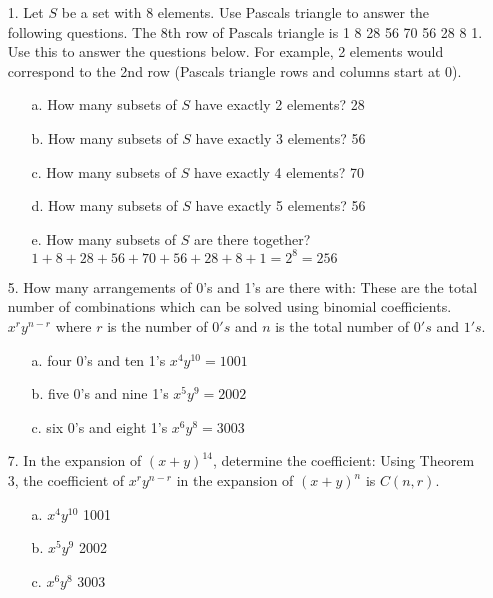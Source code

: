 \documentclass{article}
\begin{document}
\begin{itemize}
    \item[1.] Let $S$ be a set with 8 elements.  Use Pascals triangle to answer the following questions.
    The 8th row of Pascals triangle is {\color{olive}1 8 28 56 70 56 28 8 1}. Use this to answer the questions below.  For example, 2 elements would correspond to the 2nd row (Pascals triangle rows and columns start at 0).
    \begin{itemize}
        \item[a.] How many subsets of $S$ have exactly 2 elements? {\color{blue}28}
        \item[b.] How many subsets of $S$ have exactly 3 elements? {\color{blue}56}
        \item[c.] How many subsets of $S$ have exactly 4 elements?
        {\color{blue}70}
        \item[d.] How many subsets of $S$ have exactly 5 elements?
        {\color{blue}56}
        \item[e.] How many subsets of $S$ are there together? {\color{blue}$1+8+28+56+70+56+28+8+1=2^8= 256$}
    \end{itemize}
    \item[5.] How many arrangements of 0's and 1's are there with: These are the total number of combinations which can be solved using binomial coefficients.   $x^ry^{n-r}$ where $r$ is the number of $0's$ and $n$ is the total number of $0's$ and $1's$.
    \begin{itemize}
        \item[a.] four 0's and ten 1's {\color{blue} $x^4y^{10}=1001$}
        \item[b.] five 0's and nine 1's {\color{blue} $x^5y^9=2002$}
        \item[c.] six 0's and eight 1's {\color{blue} $x^6y^8=3003$}
    \end{itemize}
    \item[7.] In the expansion of $(x+y)^{14}$, determine the coefficient:
    Using Theorem 3, the coefficient of $x^ry^{n-r}$ in the expansion of $(x+y)^n$ is $C(n,r)$.
    \begin{itemize}
        \item[a.] $x^4y^{10}$ {\color{blue}1001}
        \item[b.] $x^5y^9$ {\color{blue}2002}
        \item[c.] $x^6y^8$ {\color{blue}3003}
    \end{itemize}
\end{itemize}
\end{document}
